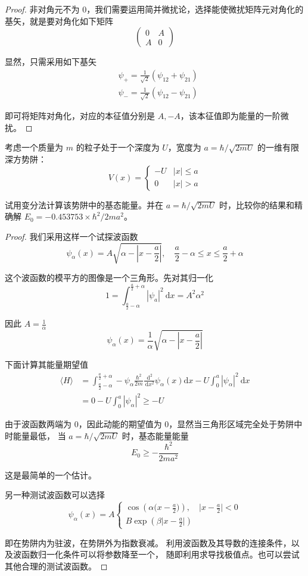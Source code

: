 \begin{proof}
非对角元不为 $0$，我们需要运用简并微扰论，选择能使微扰矩阵元对角化的基矢，就是要对角化如下矩阵
$$\begin{pmatrix}
0 & A \\
A & 0
\end{pmatrix}$$

显然，只需采用如下基矢
$$
\begin{aligned}
& \psi_{+}=\frac{1}{\sqrt{2}}\left(\psi_{12}+\psi_{21}\right) \\
& \psi_{-}=\frac{1}{\sqrt{2}}\left(\psi_{12}-\psi_{21}\right)
\end{aligned}
$$

即可将矩阵对角化，对应的本征值分别是 $A,-A$，该本征值即为能量的一阶微扰。
\end{proof}
\begin{4}
   考虑一个质量为 $m$ 的粒子处于一个深度为 $U$，宽度为 $a=\hbar / \sqrt{2mU}$ 的一维有限深方势阱：
$$V(x)= \begin{cases}-U & |x| \leq a \\ 0 & |x|>a\end{cases}$$

试用变分法计算该势阱中的基态能量。并在 $a=\hbar / \sqrt{2mU}$ 时，比较你的结果和精确解 $E_{0}=-0.453753 \times \hbar^{2} / 2ma^{2}$。 
\end{4}
\begin{proof}
我们采用这样一个试探波函数
$$\psi_{\alpha}(x)=A \sqrt{\alpha-\left|x-\frac{a}{2}\right|}, 
\quad \frac{a}{2}-\alpha \leq x \leq \frac{a}{2}+\alpha$$

这个波函数的模平方的图像是一个三角形。先对其归一化
$$1=\int_{\frac{a}{2}-\alpha}^{\frac{a}{2}+\alpha}|\psi_{a}|^{2} \mathrm{~d} x=A^{2} \alpha^{2}$$

因此 $A=\frac{1}{\alpha}$
$$\psi_{\alpha}(x)=\frac{1}{\alpha} \sqrt{\alpha-\left|x-\frac{a}{2}\right|}$$

下面计算其能量期望值
$$\begin{aligned}
\langle H\rangle & =\int_{\frac{a}{2}-\alpha}^{\frac{a}{2}+\alpha}-\psi_{\alpha} \frac{\hbar^{2}}{2m} \frac{\mathrm{~d}^{2}}{\mathrm{~d} x^{2}} \psi_{\alpha}(x) \mathrm{d} x-U \int_{0}^{a}|\psi_{\alpha}|^{2} \mathrm{~d} x \\
& =0-U \int_{0}^{a}\left|\psi_{\alpha}\right|^{2} \geq -U
\end{aligned}$$

由于波函数两端为 $0$，因此动能的期望值为 $0$，显然当三角形区域完全处于势阱中时能量最低，
当 $a=\hbar / \sqrt{2mU}$ 时，基态能量能量
$$E_{0} \geq -\frac{\hbar^{2}}{2ma^{2}}$$

这是最简单的一个估计。

另一种测试波函数可以选择
$$\psi_{\alpha}(x)=A\begin{cases}
\cos \left(\alpha\big(x-\frac{a}{2}\big)\right), \quad \big|x-\frac{a}{2}\big|<0 \\
B \exp \left(\beta\big|x-\frac{a}{2}\big|\right)
\end{cases}$$

即在势阱内为驻波，在势阱外为指数衰减。
利用波函数及其导数的连接条件，以及波函数归一化条件可以将参数降至一个，
随即利用求导找极值点。也可以尝试其他合理的测试波函数。
\end{proof}


